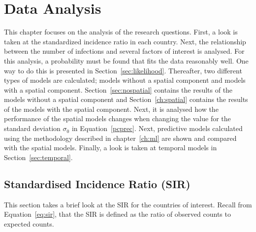 %
\chapter{Data Analysis}
\label{sec:analysis}
This chapter focuses on the analysis of the research questions. First, a look is taken at the standardized incidence ratio in each country. Next, the relationship between the number of infections and several factors of interest is analysed. For this analysis, a probability must be found that fits the data reasonably well. One way to do this is presented in Section~\ref{sec:likelihood}. Thereafter, two different types of models are calculated; models without a spatial component and models with a spatial component. Section~\ref{sec:nospatial} contains the results of the models without a spatial component and Section~\ref{ch:spatial} contains the results of the models with the spatial component. Next, it is analysed how the performance of the spatial models changes when changing the value for the standard deviation $\sigma_0$ in Equation~\ref{pcprec}. Next, predictive models calculated using the methodology described in chapter~\ref{ch:ml} are shown and compared with the spatial models. Finally, a look is taken at temporal models in Section~\ref{sec:temporal}.
\clearpage
\section{Standardised Incidence Ratio (SIR)}
This section takes a brief look at the SIR for the countries of interest. Recall from Equation~\ref{eq:sir}, that the SIR is defined as the ratio of observed counts to expected counts.
